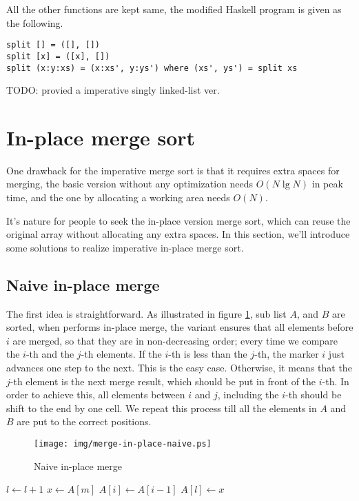 \documentclass{article}
\begin{document}
All the other functions are kept same, the modified Haskell program is given as the following.

\lstset{language=Haskell}
\begin{lstlisting}
split [] = ([], [])
split [x] = ([x], [])
split (x:y:xs) = (x:xs', y:ys') where (xs', ys') = split xs
\end{lstlisting}

TODO: provied a imperative singly linked-list ver.

\section{In-place merge sort}
One drawback for the imperative merge sort is that it requires extra spaces for merging, the basic version without
any optimization needs $O(N \lg N)$ in peak time, and the one by allocating a working area needs $O(N)$.

It's nature for people to seek the in-place version merge sort, which can reuse the original array without allocating
any extra spaces. In this section, we'll introduce some solutions to realize imperative in-place merge sort.

\subsection{Naive in-place merge}
The first idea is straightforward. As illustrated in figure \ref{fig:merge-in-place-naive}, sub list $A$, and $B$
are sorted, when performs in-place merge, the variant ensures that all elements before $i$ are merged, so that
they are in non-decreasing order; every time we compare the $i$-th and the $j$-th elements. If the $i$-th is less
than the $j$-th, the marker $i$ just advances one step to the next. This is the easy case. Otherwise, it
means that the $j$-th element is the next merge result, which should be put in front of the $i$-th. In order
to achieve this, all elements between $i$ and $j$, including the $i$-th should be shift to the end by one cell.
We repeat this process till all the elements in $A$ and $B$ are put to the correct positions.

\begin{figure}[htbp]
 \centering
 \texttt{[image: img/merge-in-place-naive.ps]}
 \caption{Naive in-place merge}
 \label{fig:merge-in-place-naive}
\end{figure}

\begin{algorithmic}
      \State $l \gets l + 1$
    \Else
      \State $x \gets A[m]$
       
        \State $A[i] \gets A[i-1]$
      \EndFor
      \State $A[l] \gets x$
    \EndIf
  \EndWhile
\EndProcedure
\end{algorithmic}
\end{document}
